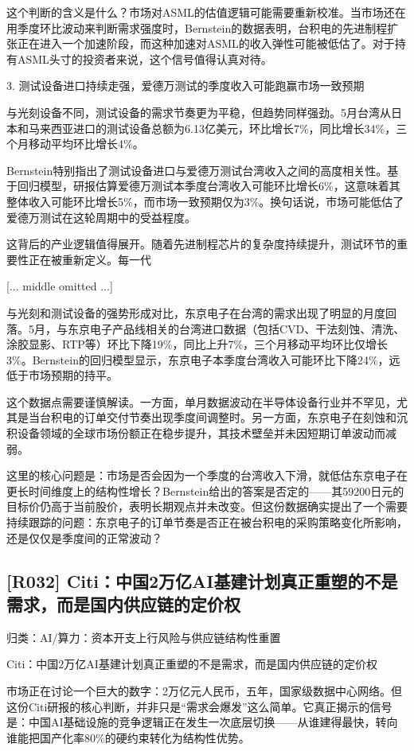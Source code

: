 \documentclass[11pt]{ctexart}
\begin{document}
这个判断的含义是什么？市场对ASML的估值逻辑可能需要重新校准。当市场还在用季度环比波动来判断需求强度时，Bernstein的数据表明，台积电的先进制程扩张正在进入一个加速阶段，而这种加速对ASML的收入弹性可能被低估了。对于持有ASML头寸的投资者来说，这个信号值得认真对待。

3. 测试设备进口持续走强，爱德万测试的季度收入可能跑赢市场一致预期

与光刻设备不同，测试设备的需求节奏更为平稳，但趋势同样强劲。5月台湾从日本和马来西亚进口的测试设备总额为6.13亿美元，环比增长7\%，同比增长34\%，三个月移动平均环比增长4\%。

Bernstein特别指出了测试设备进口与爱德万测试台湾收入之间的高度相关性。基于回归模型，研报估算爱德万测试本季度台湾收入可能环比增长6\%，这意味着其整体收入可能环比增长5\%，而市场一致预期仅为3\%。换句话说，市场可能低估了爱德万测试在这轮周期中的受益程度。

这背后的产业逻辑值得展开。随着先进制程芯片的复杂度持续提升，测试环节的重要性正在被重新定义。每一代

[... middle omitted ...]


与光刻和测试设备的强势形成对比，东京电子在台湾的需求出现了明显的月度回落。5月，与东京电子产品线相关的台湾进口数据（包括CVD、干法刻蚀、清洗、涂胶显影、RTP等）环比下降19\%，同比上升7\%，三个月移动平均环比仅增长3\%。Bernstein的回归模型显示，东京电子本季度台湾收入可能环比下降24\%，远低于市场预期的持平。

这个数据点需要谨慎解读。一方面，单月数据波动在半导体设备行业并不罕见，尤其是当台积电的订单交付节奏出现季度间调整时。另一方面，东京电子在刻蚀和沉积设备领域的全球市场份额正在稳步提升，其技术壁垒并未因短期订单波动而减弱。

这里的核心问题是：市场是否会因为一个季度的台湾收入下滑，就低估东京电子在更长时间维度上的结构性增长？Bernstein给出的答案是否定的——其59200日元的目标价仍高于当前股价，表明长期观点并未改变。但这份数据确实提出了一个需要持续跟踪的问题：东京电子的订单节奏是否正在被台积电的采购策略变化所影响，还是仅仅是季度间的正常波动？

\subsection{[R032] Citi：中国2万亿AI基建计划真正重塑的不是需求，而是国内供应链的定价权}
{\small\color{refgray}归类：AI/算力：资本开支上行风险与供应链结构性重置}

Citi：中国2万亿AI基建计划真正重塑的不是需求，而是国内供应链的定价权

市场正在讨论一个巨大的数字：2万亿元人民币，五年，国家级数据中心网络。但这份Citi研报的核心判断，并非只是“需求会爆发”这么简单。它真正揭示的信号是：中国AI基础设施的竞争逻辑正在发生一次底层切换——从谁建得最快，转向谁能把国产化率80\%的硬约束转化为结构性优势。
\end{document}
